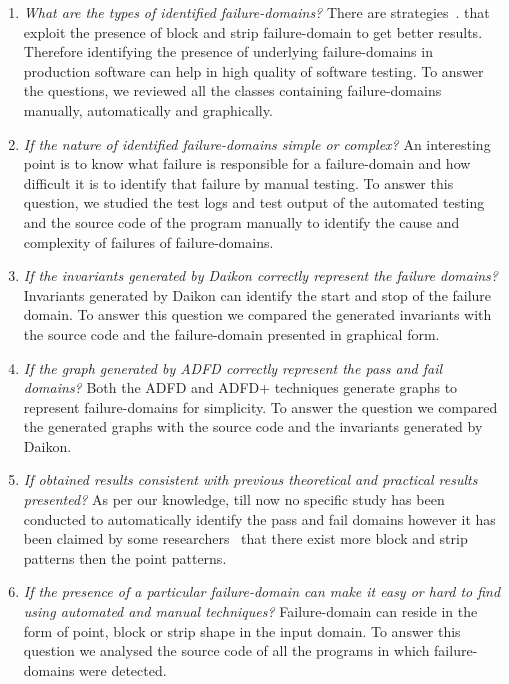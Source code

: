 \documentclass[runningheads,a4paper]{llncs}
\begin{document}
\begin{enumerate}
\item \textit{What are the types of identified failure-domains?} There are strategies~\cite{}.  that exploit the presence of block and strip failure-domain to get better results. Therefore identifying the presence of underlying failure-domains in production software can help in high quality of software testing.  To answer the questions, we reviewed all the classes containing failure-domains manually, automatically and graphically.
%
\item \textit{If the nature of identified failure-domains simple or complex?} An interesting point is to know what failure is responsible for a failure-domain and how difficult it is to identify that failure by manual testing. To answer this question, we studied the test logs and test output of the automated testing and the source code of the program manually to identify the cause and complexity of failures of failure-domains. 
%
\item \textit{If the invariants generated by Daikon correctly represent the failure domains?} Invariants generated by Daikon can identify the start and stop of the failure domain. To answer this question we compared the generated invariants with the source code and the failure-domain presented in graphical form.
%
\item \textit{If the graph generated by ADFD correctly represent the pass and fail domains?} Both the ADFD and ADFD+ techniques generate graphs to represent failure-domains for simplicity. To answer the question we compared the generated graphs with the source code and the invariants generated by Daikon.
%
\item \textit{If obtained results consistent with previous theoretical and practical results presented?}  As per our knowledge, till now no specific study has been conducted to automatically identify the pass and fail domains however it has been claimed by some researchers~\cite{} that there exist more block and strip patterns then the point patterns. 
%
\item \textit{If the presence of a particular failure-domain can make it easy or hard to find using automated and manual techniques?} 
Failure-domain can reside in the form of point, block or strip shape in the input domain. To answer this question we analysed the source code of all the programs in which failure-domains were detected.
\end{enumerate}
\end{document}
